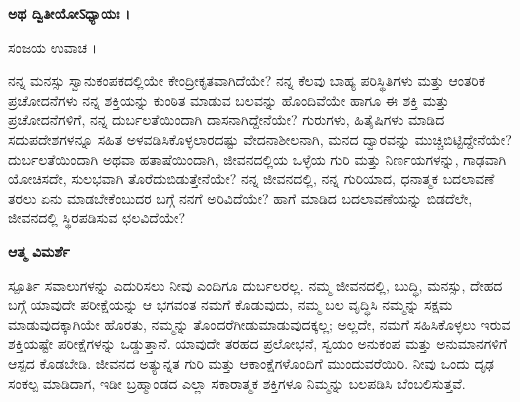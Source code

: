 \begin{center}
{\textbf{ಅಥ ದ್ವಿತೀಯೋऽಧ್ಯಾಯಃ ।}\\}
\end{center}
ಸಂಜಯ ಉವಾಚ ।\\

\newpage
\begin{mananam}{}
\small \mananatext ನನ್ನ ಮನಸ್ಸು ಸ್ವಾನುಕಂಪಕದಲ್ಲಿಯೇ ಕೇಂದ್ರೀಕೃತವಾಗಿದೆಯೇ? ನನ್ನ ಕೆಲವು ಬಾಹ್ಯ ಪರಿಸ್ಥಿತಿಗಳು ಮತ್ತು ಆಂತರಿಕ ಪ್ರಚೋದನೆಗಳು ನನ್ನ ಶಕ್ತಿಯನ್ನು ಕುಂಠಿತ ಮಾಡುವ ಬಲವನ್ನು ಹೊಂದಿವೆಯೇ ಹಾಗೂ ಈ ಶಕ್ತಿ ಮತ್ತು ಪ್ರಚೋದನೆಗಳಿಗೆ, ನನ್ನ ದುರ್ಬಲತೆಯಿಂದಾಗಿ ದಾಸನಾಗಿದ್ದೇನೆಯೇ? ಗುರುಗಳು, ಹಿತೈಷಿಗಳು ಮಾಡಿದ ಸದುಪದೇಶಗಳನ್ನೂ ಸಹಿತ ಅಳವಡಿಸಿಕೊಳ್ಳಲಾರದಷ್ಟು ವೇದನಾಶೀಲನಾಗಿ, ಮನದ ದ್ವಾರವನ್ನು ಮುಚ್ಚಿಬಿಟ್ಟಿದ್ದೇನೆಯೇ?\\
ದುರ್ಬಲತೆಯಿಂದಾಗಿ ಅಥವಾ ಹತಾಷೆಯಿಂದಾಗಿ, ಜೀವನದಲ್ಲಿಯ ಒಳ್ಳೆಯ ಗುರಿ ಮತ್ತು ನಿರ್ಣಯಗಳನ್ನು, ಗಾಢವಾಗಿ ಯೋಚಿಸದೇ, ಸುಲಭವಾಗಿ ತೊರೆದುಬಿಡುತ್ತೇನೆಯೇ? ನನ್ನ ಜೀವನದಲ್ಲಿ, ನನ್ನ ಗುರಿಯಾದ, ಧನಾತ್ಮಕ ಬದಲಾವಣೆ ತರಲು ಏನು ಮಾಡಬೇಕೆಂಬುದರ ಬಗ್ಗೆ ನನಗೆ ಅರಿವಿದೆಯೇ? ಹಾಗೆ ಮಾಡಿದ ಬದಲಾವಣೆಯನ್ನು ಬಿಡದೆಲೇ, ಜೀವನದಲ್ಲಿ ಸ್ಥಿರಪಡಿಸುವ ಛಲವಿದೆಯೇ?
\end{mananam}
\WritingHand\enspace\textbf{ಆತ್ಮ ವಿಮರ್ಶೆ}\\
\begin{inspiration}{\mananamfont ಸ್ಪೂರ್ತಿ}
\small \mananatext ಸವಾಲುಗಳನ್ನು ಎದುರಿಸಲು ನೀವು ಎಂದಿಗೂ ದುರ್ಬಲರಲ್ಲ. ನಮ್ಮ ಜೀವನದಲ್ಲಿ,  ಬುದ್ಧಿ, ಮನಸ್ಸು, ದೇಹದ ಬಗ್ಗೆ ಯಾವುದೇ ಪರೀಕ್ಷೆಯನ್ನು ಆ ಭಗವಂತ ನಮಗೆ ಕೊಡುವುದು, ನಮ್ಮ ಬಲ ವೃದ್ಧಿಸಿ ನಮ್ಮನ್ನು ಸಕ್ಷಮ ಮಾಡುವುದಕ್ಕಾಗಿಯೇ ಹೊರತು,  ನಮ್ಮನ್ನು ತೊಂದರೆಗೀಡುಮಾಡುವುದಕ್ಕಲ್ಲ; ಅಲ್ಲದೇ, ನಮಗೆ ಸಹಿಸಿಕೊಳ್ಳಲು ಇರುವ ಶಕ್ತಿಯಷ್ಟೇ ಪರೀಕ್ಷೆಗಳನ್ನು ಒಡ್ಡುತ್ತಾನೆ. ಯಾವುದೇ ತರಹದ ಪ್ರಲೋಭನೆ, ಸ್ವಯಂ ಅನುಕಂಪ ಮತ್ತು ಅನುಮಾನಗಳಿಗೆ ಆಸ್ಪದ ಕೊಡಬೇಡಿ. ಜೀವನದ ಅತ್ಯುನ್ನತ ಗುರಿ ಮತ್ತು ಆಕಾಂಕ್ಷೆಗಳೊಂದಿಗೆ ಮುಂದುವರೆಯಿರಿ. ನೀವು ಒಂದು ದೃಢ ಸಂಕಲ್ಪ ಮಾಡಿದಾಗ, ಇಡೀ ಬ್ರಹ್ಮಾಂಡದ ಎಲ್ಲಾ ಸಕಾರಾತ್ಮಕ ಶಕ್ತಿಗಳೂ ನಿಮ್ಮನ್ನು ಬಲಪಡಿಸಿ ಬೆಂಬಲಿಸುತ್ತವೆ.
\end{inspiration}
\newpage

